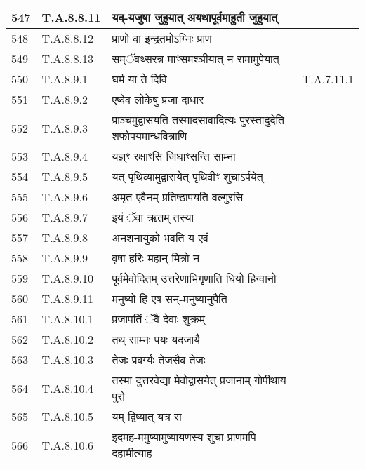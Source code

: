 \documentclass[17pt]{extarticle}
\begin{document}
\begin{longtable}{||p{0.4in}||p{0.9in}||p{4.0in}||p{0.9in}||}
        \hline
            547 & T.A.8.8.11 & यद्{-}यजुषा जुहुयात् अयथापूर्वमाहुती जुहुयात् &      \\
        \hline
            548 & T.A.8.8.12 & प्राणो वा इन्द्रतमोऽग्निः प्राण &      \\
        \hline
            549 & T.A.8.8.13 & सम्ॅवथ्सरन्न माꣳसमश्ञीयात् न रामामुपेयात् &      \\
        \hline
            550 & T.A.8.9.1 & घर्म या ते दिवि & T.A.7.11.1        \\
        \hline
            551 & T.A.8.9.2 & एष्वेव लोकेषु प्रजा दाधार &      \\
        \hline
            552 & T.A.8.9.3 & प्राञ्चमुद्वासयति तस्मादसावादित्यः पुरस्तादुदेति शफोपयमान्धवित्राणि &      \\
        \hline
            553 & T.A.8.9.4 & यज्ञ्ꣳ रक्षाꣳसि जिघाꣳसन्ति साम्ना &      \\
        \hline
            554 & T.A.8.9.5 & यत् पृथिव्यामुद्वासयेत् पृथिवीꣳ शुचाऽर्पयेत् &      \\
        \hline
            555 & T.A.8.9.6 & अमृत एवैनम् प्रतिष्ठापयति वल्गुरसि &      \\
        \hline
            556 & T.A.8.9.7 & इयं ॅवा ऋतम् तस्या &      \\
        \hline
            557 & T.A.8.9.8 & अनशनायुको भवति य एवं &      \\
        \hline
            558 & T.A.8.9.9 & वृषा हरिः महान्{-}मित्रो न &      \\
        \hline
            559 & T.A.8.9.10 & पूर्वमेवोदितम् उत्तरेणाभिगृणाति धियो हिन्वानो &      \\
        \hline
            560 & T.A.8.9.11 & मनुष्यो हि एष सन्{-}मनुष्यानुपैति &      \\
        \hline
            561 & T.A.8.10.1 & प्रजापतिं ॅवै देवाः शुक्रम् &      \\
        \hline
            562 & T.A.8.10.2 & तथ् साम्नः पयः यदजायै &      \\
        \hline
            563 & T.A.8.10.3 & तेजः प्रवर्ग्यः तेजसैव तेजः &      \\
        \hline
            564 & T.A.8.10.4 & तस्मा{-}दुत्तरवेद्या{-}मेवोद्वासयेत् प्रजानाम् गोपीथाय पुरो &      \\
        \hline
            565 & T.A.8.10.5 & यम् द्विष्यात् यत्र स &      \\
        \hline
            566 & T.A.8.10.6 & इदमह{-}ममुष्यामुष्यायणस्य शुचा प्राणमपि दहामीत्याह &      \\

\end{longtable}
\end{document}
